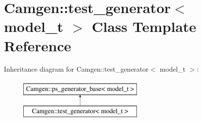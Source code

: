 \hypertarget{a00544}{}\section{Camgen\+:\+:test\+\_\+generator$<$ model\+\_\+t $>$ Class Template Reference}
\label{a00544}
Inheritance diagram for Camgen\+:\+:test\+\_\+generator$<$ model\+\_\+t $>$\+:\begin{figure}[H]
\begin{center}
\leavevmode
\includegraphics[height=2.000000cm]{a00544}
\end{center}
\end{figure}
